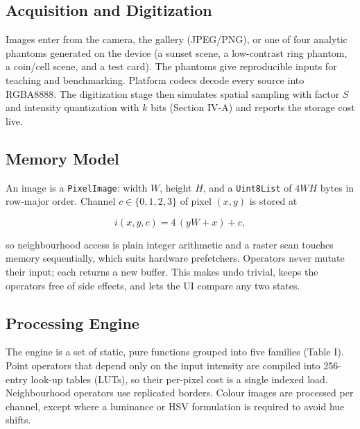 \documentclass[journal]{IEEEtran}
\begin{document}
\subsection{Acquisition and Digitization}
Images enter from the camera, the gallery (JPEG/PNG), or one of four analytic phantoms generated on the device (a sunset scene, a low-contrast ring phantom, a coin/cell scene, and a test card). The phantoms give reproducible inputs for teaching and benchmarking. Platform codecs decode every source into RGBA8888. The digitization stage then simulates spatial sampling with factor $S$ and intensity quantization with $k$ bits (Section IV-A) and reports the storage cost live.

\subsection{Memory Model}
An image is a \texttt{PixelImage}: width $W$, height $H$, and a \texttt{Uint8List} of $4WH$ bytes in row-major order. Channel $c\in\{0,1,2,3\}$ of pixel $(x, y)$ is stored at

\begin{equation}
  i(x, y, c) = 4\,(yW + x) + c,
  \label{eq:offset}
\end{equation}

so neighbourhood access is plain integer arithmetic and a raster scan touches memory sequentially, which suits hardware prefetchers. Operators never mutate their input; each returns a new buffer. This makes undo trivial, keeps the operators free of side effects, and lets the UI compare any two states.

\subsection{Processing Engine}
The engine is a set of static, pure functions grouped into five families (Table I). Point operators that depend only on the input intensity are compiled into 256-entry look-up tables (LUTs), so their per-pixel cost is a single indexed load. Neighbourhood operators use replicated borders. Colour images are processed per channel, except where a luminance or HSV formulation is required to avoid hue shifts.
\end{document}
